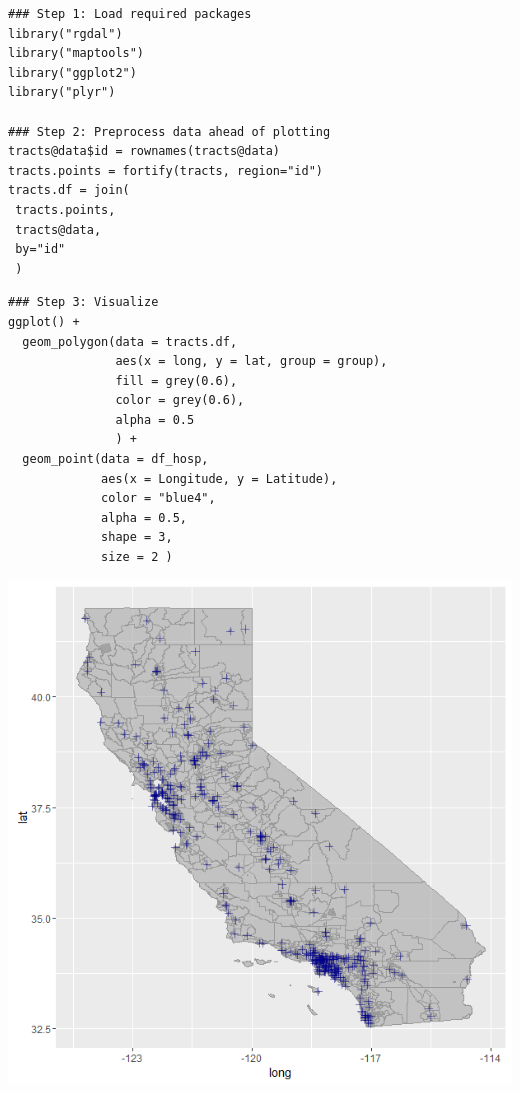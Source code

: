 \begin{frame}
\begin{lstlisting}
### Step 1: Load required packages
library("rgdal") 
library("maptools")
library("ggplot2")
library("plyr")

### Step 2: Preprocess data ahead of plotting
tracts@data$id = rownames(tracts@data)
tracts.points = fortify(tracts, region="id")
tracts.df = join(
 tracts.points, 
 tracts@data, 
 by="id"
 )
\end{lstlisting}

\newpage
\begin{lstlisting}
### Step 3: Visualize
ggplot() +
  geom_polygon(data = tracts.df,
               aes(x = long, y = lat, group = group),
               fill = grey(0.6), 
               color = grey(0.6), 
               alpha = 0.5
               ) + 
  geom_point(data = df_hosp,
             aes(x = Longitude, y = Latitude),
             color = "blue4", 
             alpha = 0.5, 
             shape = 3,
             size = 2 )
\end{lstlisting}

\newpage
       \begin{center}
		\includegraphics[scale=0.3]{images/shapefile_v1.png}
	\end{center}

\end{frame}

